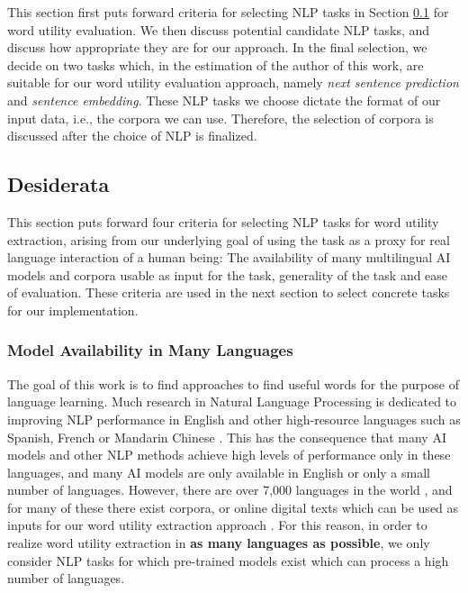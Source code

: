 This section first puts forward criteria for selecting NLP tasks in Section \ref{sec:nlp-tasks-desiderata} for word utility evaluation.
We then discuss potential candidate NLP tasks, and discuss how appropriate they are for our approach.
In the final selection, we decide on two tasks which, in the estimation of the author of this work, are suitable for our word utility evaluation approach, namely \textit{next sentence prediction} and \textit{sentence embedding}.
These NLP tasks we choose dictate the format of our input data, i.e., the corpora we can use.
Therefore, the selection of corpora is discussed after the choice of NLP is finalized.

\subsection{Desiderata} \label{sec:nlp-tasks-desiderata}

This section puts forward four criteria for selecting NLP tasks for word utility extraction, arising from our underlying goal of using the task as a proxy for real language interaction of a human being:
The availability of many multilingual AI models and corpora usable as input for the task, generality of the task and ease of evaluation.
These criteria are used in the next section to select concrete tasks for our implementation.

\subsubsection{Model Availability in Many Languages}
The goal of this work is to find approaches to find useful words for the purpose of language learning.
Much research in Natural Language Processing is dedicated to improving NLP performance in English and other high-resource languages such as Spanish, French or Mandarin Chinese .
This has the consequence that many AI models and other NLP methods achieve high levels of performance only in these languages, and many AI models are only available in English or only a small number of languages.
However, there are over 7,000 languages in the world , and for many of these there exist corpora, or online digital texts which can be used as inputs for our word utility extraction approach .
For this reason, in order to realize word utility extraction in \textbf{as many languages as possible}, we only consider NLP tasks for which pre-trained models exist which can process a high number of languages.


